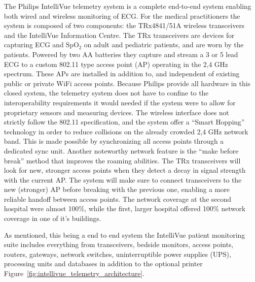 The Philips IntelliVue telemetry system is a complete end-to-end system enabling both wired and wireless monitoring of ECG. For the medical practitioners the system is composed of two components: the TRx4841/51A wireless transceivers and the IntelliVue Information Centre. The TRx transceivers are devices for capturing ECG and SpO$_2$ on adult and pediatric patients, and are worn by the patients. Powered by two AA batteries they  capture and stream a 3 or 5 lead ECG to a custom 802.11 type access point (AP) operating in the 2,4 GHz spectrum. These APs are installed in addition to, and independent of existing public or private WiFi access points. Because Philips provide all hardware in this closed system, the telemetry system does not have to confine to the interoperability requirements it would needed if the system were to allow for proprietary sensors and measuring devices. The wireless interface does not strictly follow the 802.11 specification, and the system offer a ``Smart Hopping'' technology in order to reduce collisions on the already crowded 2,4 GHz network band. This is made possible by synchronizing all access points through a dedicated sync unit. Another noteworthy network feature is the ``make before break'' method that improves the roaming abilities. The TRx transceivers will look for new, stronger access points when they detect a decay in signal strength with the current AP. The system will make sure to connect transceivers to the new (stronger) AP before breaking with the previous one, enabling a more reliable handoff between access points. The network coverage at the second hospital were almost 100\%, while the first, larger hospital offered 100\% network coverage in one of it's buildings.

As mentioned, this being a end to end system the IntelliVue patient monitoring suite includes everything from transceivers, bedside monitors, access points, routers, gateways, network switches, uninterruptible power supplies (UPS), processing units and databases in addition to the optional printer Figure~\ref{fig:intellivue_telemetry_architecture}.



